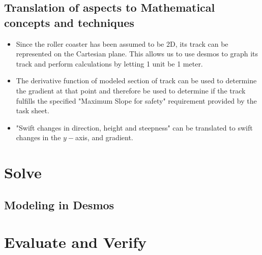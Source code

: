 \documentclass[11pt, letterpaper]{article}
\begin{document}
\subsection{Translation of aspects to Mathematical concepts and techniques}
\begin{itemize}
	\item Since the roller coaster has been assumed to be 2D, its track can be represented on the Cartesian plane. This allows us to use desmos to graph its track and perform calculations by letting 1 unit be 1 meter. 
	\item The derivative function of modeled section of track can be used to determine the gradient at that point and therefore be used to determine if the track fulfills the specified "Maximum Slope for safety" requirement provided by the task sheet.
	\item "Swift changes in direction, height and steepness" can be translated to swift changes in the $y-$axis, and gradient.  
\end{itemize}


\section{Solve}
\subsection{Modeling in Desmos}




\section{Evaluate and Verify}
\end{document}
